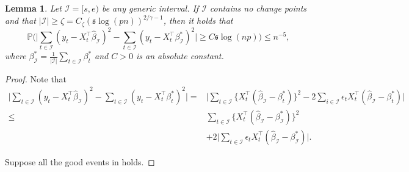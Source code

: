 \documentclass[11pt]{article}
\newcommand{\I}{{\mathcal I }}
\newcommand{\s}{ { \mathfrak{s}  } }
\newcommand{\p}{\mathbb P}
\theoremstyle{plain}
\newtheorem{lemma}[theorem]{Lemma}
\theoremstyle{definition}
\begin{document}
\begin{lemma} \label{eq:regression one change deviation bound}
Let $\mathcal I =[s,e) $ be any generic interval.  
  If $\I$ contains no change points and that 
$|\I| \ge \zeta =  C_\zeta    ( \s \log(pn) )^{2/\gamma -1 }$, then it holds that 
$$\p \bigg( \bigg|   \sum_{ t   \in \I } (y_ t   - X_t  ^\top \widehat  \beta _\I   )^2  - \sum_{ t    \in \I } (y_t       -  X_t ^\top \beta^*_\I    )^2  \bigg|  \ge C    \s  \log(np)  \bigg)  \le  n^{-5}, $$
where $  \beta _\I^*  = \frac{1}{|\I | } \sum_{t \in \I } \beta ^* _t  $ and $C > 0$ is an absolute constant.
\end{lemma}
\begin{proof} 
   Note that 
\begin{align}  \nonumber 
   \bigg|  \sum_{ t     \in \I } (y_ t      - X_t   ^\top \widehat \beta_\I   )^2  - \sum_{ t     \in \I } (y_ t      - X_t  ^\top \beta^* _t      )^2  \bigg|   
 = &\bigg| \sum_{t \in \I } \big\{  X_t  ^\top  ( \widehat \beta_\I  -   \beta^* _t  )   \big\} ^2 -  2 \sum_{i\in \I }  \epsilon_t  X_t ^\top ( \widehat \beta_\I   -  \beta^*_t  ) \bigg| 
 \\ \label{eq:regression one change point deviation bound term 1}
 \le &   \sum_{t \in \I } \big\{  X_t^\top  ( \widehat \beta_\I  -    \beta^*_\I  )   \big\}   ^2 
 \\   \label{eq:regression one change point deviation bound term 3}
 &+ 2 \bigg|    \sum_{t \in \I }  \epsilon_t X_t^\top ( \widehat \beta_\I   -  \beta^*_\I ) \bigg|  .
\end{align}


Suppose all the good events in  holds. 


\end{proof}
\end{document}
